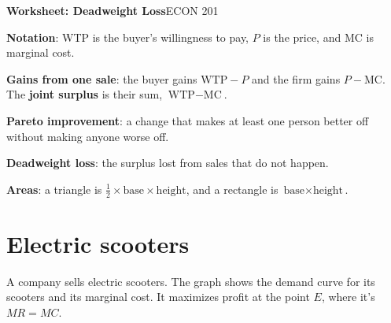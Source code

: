\documentclass[11pt]{article}
\begin{document}
{\LARGE\bfseries\color{accent} Worksheet: Deadweight Loss}\hfill{\large ECON 201}

\newcommand{\term}[1]{\textcolor{accentdark}{\textbf{#1}}}

\newenvironment{deflist}
  {\begin{list}{\textbullet}{%
     \setlength{\leftmargin}{1.1em}\setlength{\labelwidth}{0.7em}%
     \setlength{\labelsep}{0.4em}\setlength{\itemindent}{0pt}%
     \setlength{\listparindent}{0pt}\setlength{\topsep}{2pt}%
     \setlength{\partopsep}{0pt}\setlength{\parsep}{0pt}%
     \setlength{\itemsep}{2pt}}}
  {\end{list}}

\begin{tcolorbox}[colback=cream, colframe=accent, boxrule=0.6pt, arc=2pt,
  left=6pt, right=6pt, top=4pt, bottom=4pt, title=Definitions,
  fonttitle=\bfseries, coltitle=white]
\begin{deflist}
\item \term{Notation}: WTP is the buyer's willingness to pay, $P$ is the
  price, and MC is marginal cost.
\item \term{Gains from one sale}: the buyer gains $\text{WTP} - P$ and the firm
  gains $P - \text{MC}$. The \term{joint surplus} is their sum,
  $\text{WTP} - \text{MC}$.
\item \term{Pareto improvement}: a change that makes at least one person
  better off without making anyone worse off.
\item \term{Deadweight loss}: the surplus lost from sales that do not happen.
\item \term{Areas}: a triangle is $\tfrac{1}{2} \times \text{base} \times
  \text{height}$, and a rectangle is $\text{base} \times \text{height}$.
\end{deflist}
\end{tcolorbox}

\section{Electric scooters}

A company sells electric scooters. The graph shows the demand curve for its
scooters and its marginal cost. It maximizes profit at the point $E$, where it's $MR=MC$.
\end{document}
